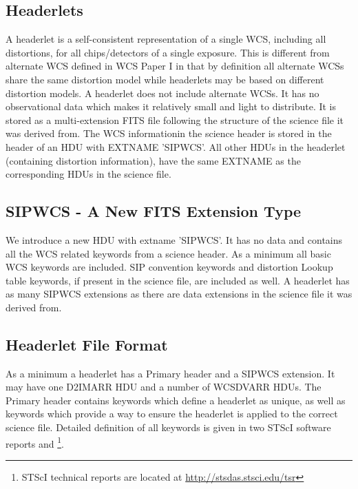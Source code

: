 \subsection{Headerlets}
A headerlet is a self-consistent representation of a single WCS, including all distortions, for all chips/detectors of a single exposure. This is different from alternate WCS defined in WCS Paper I \citep{greisen_2002} in that by definition all alternate WCSs share the same distortion model while headerlets may be based on different distortion models. A headerlet does not include alternate WCSs. It has no observational data which makes it relatively small and light to distribute. It is stored as a multi-extension FITS file following the structure of the science file it was derived from. The WCS informationin the science header is stored in the header of an HDU with EXTNAME 'SIPWCS'. All other HDUs in the headerlet (containing distortion information), have the same EXTNAME as the corresponding HDUs in the science file.

\subsection{SIPWCS - A New FITS Extension Type}
We introduce a new HDU with extname 'SIPWCS'. It has no data and contains all the WCS related keywords from a science header. As a minimum all basic WCS keywords \citep{greisen_2002} are included. SIP convention keywords \citep{shupe_2005} and distortion Lookup table keywords, if present in the science file, are included as well. A headerlet has as many SIPWCS extensions as there are data extensions in the science file it was derived from. 

\subsection{Headerlet File Format}
As a minimum a headerlet has a Primary header  and a SIPWCS extension. It may have one D2IMARR HDU and a number of WCSDVARR HDUs. The Primary header contains keywords which define a headerlet as unique, as well as keywords which provide a way to ensure the headerlet is applied to the correct science file. Detailed definition of all keywords is given in two STScI software reports \citet{hack_fc} and \citet{hack_hlet}\footnote{STScI technical reports are located at \url{http://stsdas.stsci.edu/tsr}}.

